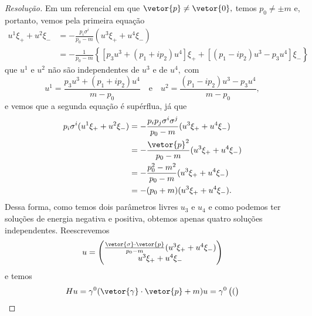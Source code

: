 \begin{proof}[Resolução]
    Em um referencial em que \(\vetor{p} \neq \vetor{0},\) temos \(p_0 \neq \pm m\)  e, portanto, vemos pela primeira equação
    \begin{align*}
        u^1 \xi_+ + u^2 \xi_- &= -\frac{p_i\sigma^i}{p_0 - m} (u^3 \xi_+ + u^4 \xi_-)\\
                              &= -\frac{1}{p_0 - m} \left\{\left[p_3 u^3 + (p_1 + i p_2)u^4\right]\xi_+ + \left[(p_1 - i p_2) u^3 - p_3 u^4\right]\xi_-\right\}
    \end{align*}
    que \(u^1\) e \(u^2\) não são independentes de \(u^3\) e de \(u^4,\) com
    \begin{equation*}
        u^1 = \frac{p_3 u^3 + (p_1 + i p_2) u^4}{m - p_0}
        \quad\text{e}\quad
        u^2 = \frac{(p_1 - ip_2) u^3 - p_3 u^4}{m - p_0},
    \end{equation*}
    e vemos que a segunda equação é supérflua, já que
    \begin{align*}
        p_i \sigma^i (u^1 \xi_+ + u^2 \xi_-) &= - \frac{p_i p_j \sigma^i \sigma^j}{p_0 - m} (u^3 \xi_+ + u^4 \xi_-)\\
                                             &= -\frac{\vetor{p}^2}{p_0 - m} (u^3 \xi_+ + u^4 \xi_-)\\
                                             &= - \frac{p_0^2 - m^2}{p_0 - m} (u^3 \xi_+ + u^4 \xi_-)\\
                                             &= - (p_0 + m) (u^3 \xi_+ + u^4 \xi_-).
    \end{align*}
    Dessa forma, como temos dois parâmetros livres \(u_3\) e \(u_4\) e como podemos ter soluções de energia negativa e positiva, obtemos apenas quatro soluções independentes. Reescrevemos
    \begin{equation*}
        u = \begin{pmatrix}
            \frac{\vetor{\sigma}\cdot\vetor{p}}{p_0 - m} (u^3\xi_+ + u^4 \xi_-)\\
            u^3\xi_+ + u^4 \xi_-
        \end{pmatrix}
    \end{equation*}
    e temos
    \begin{equation*}
        H u = \gamma^0 (\vetor{\gamma} \cdot \vetor{p} + m) u = \gamma^0\begin{pmatrix}
            (
        \end{pmatrix}
    \end{equation*}
\end{proof}
